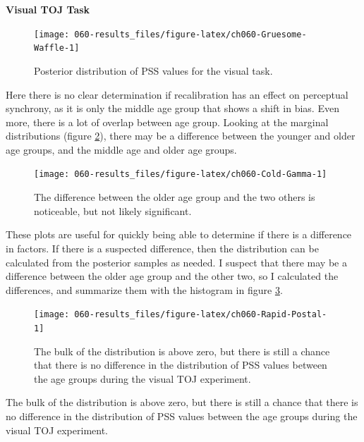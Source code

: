 \documentclass[11pt, oneside, openany]{scrbook}
\begin{document}
\textbf{Visual TOJ Task}

\begin{figure}

{\centering \texttt{[image: 060-results\_files/figure-latex/ch060-Gruesome-Waffle-1]} 

}

\caption{Posterior distribution of PSS values for the visual task.}\label{fig:ch060-Gruesome-Waffle}
\end{figure}

Here there is no clear determination if recalibration has an effect on perceptual synchrony, as it is only the middle age group that shows a shift in bias. Even more, there is a lot of overlap between age group. Looking at the marginal distributions (figure \ref{fig:ch060-Cold-Gamma}), there may be a difference between the younger and older age groups, and the middle age and older age groups.

\begin{figure}

{\centering \texttt{[image: 060-results\_files/figure-latex/ch060-Cold-Gamma-1]} 

}

\caption{The difference between the older age group and the two others is noticeable, but not likely significant.}\label{fig:ch060-Cold-Gamma}
\end{figure}

These plots are useful for quickly being able to determine if there is a difference in factors. If there is a suspected difference, then the distribution can be calculated from the posterior samples as needed. I suspect that there may be a difference between the older age group and the other two, so I calculated the differences, and summarize them with the histogram in figure \ref{fig:ch060-Rapid-Postal}.

\begin{figure}

{\centering \texttt{[image: 060-results\_files/figure-latex/ch060-Rapid-Postal-1]} 

}

\caption{The bulk of the distribution is above zero, but there is still a chance that there is no difference in the distribution of PSS values between the age groups during the visual TOJ experiment.}\label{fig:ch060-Rapid-Postal}
\end{figure}

The bulk of the distribution is above zero, but there is still a chance that there is no difference in the distribution of PSS values between the age groups during the visual TOJ experiment.
\end{document}
